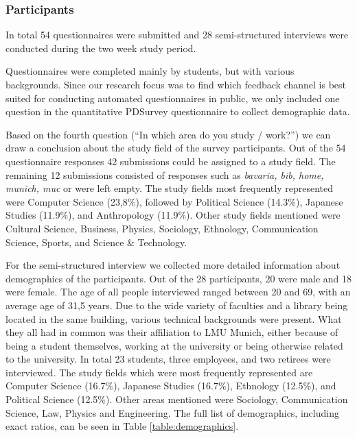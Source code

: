 	\subsubsection{Participants} %

		In total 54 questionnaires were submitted and 28 semi-structured interviews were conducted during the two week study period.

		Questionnaires were completed mainly by students, but with various backgrounds. Since our research focus was to find which feedback channel is best suited for conducting automated questionnaires in public, we only included one question in the quantitative PDSurvey questionnaire to collect demographic data. 

		Based on the fourth question (``In which area do you study / work?'') we can draw a conclusion about the study field of the survey participants. Out of the 54 questionnaire responses 42 submissions could be assigned to a study field. The remaining 12 submissions consisted of responses such as \textit{bavaria, bib, home, munich, muc} or were left empty. The study fields most frequently represented were Computer Science (23,8\%), followed by Political Science (14.3\%), Japanese Studies (11.9\%), and Anthropology (11.9\%). Other study fields mentioned were Cultural Science, Business, Physics, Sociology, Ethnology, Communication Science, Sports, and Science \& Technology. 

		For the semi-structured interview we collected more detailed information about demographics of the participants. Out of the 28 participants,
		20 were male and 18 were female. The age of all people interviewed ranged between 20 and 69, with an average age of 31,5 years.	Due to the wide variety of faculties and a library being located in the same building, various technical backgrounds were present. What they all had in common was their affiliation to LMU Munich, either because of being a student themselves, working at the university or being otherwise related to the university. In total 23 students, three employees, and two retirees were interviewed. The study fields which were most frequently represented are Computer Science (16.7\%), Japanese Studies (16.7\%), Ethnology (12.5\%), and Political Science (12.5\%). Other areas mentioned were Sociology, Communication Science, Law, Physics and Engineering. The full list of demographics, including exact ratios, can be seen in Table \ref{table:demographics}.


